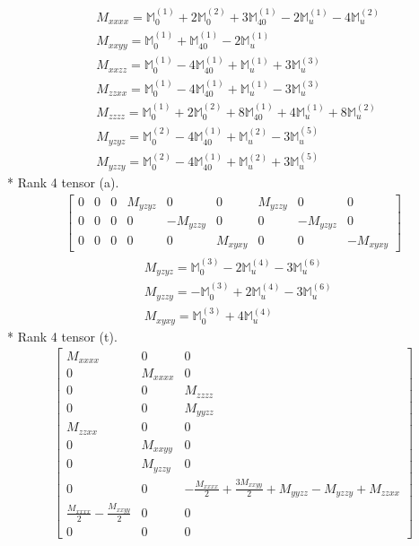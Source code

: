 \documentclass[fleqn,8pt,landscape]{jsarticle}
\begin{document}
\begin{align*}
& M_{xxxx} = \mathbb{M}_{0}^{(1)} + 2 \mathbb{M}_{0}^{(2)} + 3 \mathbb{M}_{40}^{(1)} - 2 \mathbb{M}_{u}^{(1)} - 4 \mathbb{M}_{u}^{(2)} \\
& M_{xxyy} = \mathbb{M}_{0}^{(1)} + \mathbb{M}_{40}^{(1)} - 2 \mathbb{M}_{u}^{(1)} \\
& M_{xxzz} = \mathbb{M}_{0}^{(1)} - 4 \mathbb{M}_{40}^{(1)} + \mathbb{M}_{u}^{(1)} + 3 \mathbb{M}_{u}^{(3)} \\
& M_{zzxx} = \mathbb{M}_{0}^{(1)} - 4 \mathbb{M}_{40}^{(1)} + \mathbb{M}_{u}^{(1)} - 3 \mathbb{M}_{u}^{(3)} \\
& M_{zzzz} = \mathbb{M}_{0}^{(1)} + 2 \mathbb{M}_{0}^{(2)} + 8 \mathbb{M}_{40}^{(1)} + 4 \mathbb{M}_{u}^{(1)} + 8 \mathbb{M}_{u}^{(2)} \\
& M_{yzyz} = \mathbb{M}_{0}^{(2)} - 4 \mathbb{M}_{40}^{(1)} + \mathbb{M}_{u}^{(2)} - 3 \mathbb{M}_{u}^{(5)} \\
& M_{yzzy} = \mathbb{M}_{0}^{(2)} - 4 \mathbb{M}_{40}^{(1)} + \mathbb{M}_{u}^{(2)} + 3 \mathbb{M}_{u}^{(5)}
\end{align*}
* Rank 4 tensor (a).
\begin{align*}
\begin{bmatrix} 0 & 0 & 0 & M_{yzyz} & 0 & 0 & M_{yzzy} & 0 & 0 \\ 0 & 0 & 0 & 0 & - M_{yzzy} & 0 & 0 & - M_{yzyz} & 0 \\ 0 & 0 & 0 & 0 & 0 & M_{xyxy} & 0 & 0 & - M_{xyxy} \end{bmatrix}
\end{align*}
\begin{align*}
& M_{yzyz} = \mathbb{M}_{0}^{(3)} - 2 \mathbb{M}_{u}^{(4)} - 3 \mathbb{M}_{u}^{(6)} \\
& M_{yzzy} = - \mathbb{M}_{0}^{(3)} + 2 \mathbb{M}_{u}^{(4)} - 3 \mathbb{M}_{u}^{(6)} \\
& M_{xyxy} = \mathbb{M}_{0}^{(3)} + 4 \mathbb{M}_{u}^{(4)}
\end{align*}
* Rank 4 tensor (t).
\begin{align*}
\begin{bmatrix} M_{xxxx} & 0 & 0 \\ 0 & M_{xxxx} & 0 \\ 0 & 0 & M_{zzzz} \\ 0 & 0 & M_{yyzz} \\ M_{zzxx} & 0 & 0 \\ 0 & M_{xxyy} & 0 \\ 0 & M_{yzzy} & 0 \\ 0 & 0 & - \frac{M_{xxxx}}{2} + \frac{3 M_{xxyy}}{2} + M_{yyzz} - M_{yzzy} + M_{zzxx} \\ \frac{M_{xxxx}}{2} - \frac{M_{xxyy}}{2} & 0 & 0 \\ 0 & 0 & 0 \end{bmatrix}
\end{align*}
\end{document}
